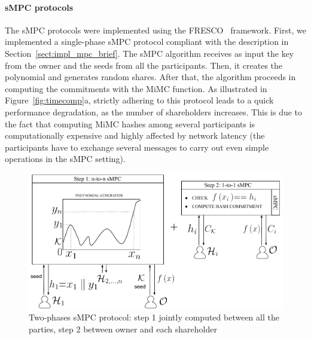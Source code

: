 \medskip

\paragraph*{sMPC protocols}

The sMPC protocols were implemented using the FRESCO~\cite{FRESCO-git,damgaard2016mpc} framework.
First, we implemented a single-phase sMPC protocol compliant with the description in Section~\ref{sect:impl_mpc_brief}.
The sMPC algorithm receives as input the key \key from the owner \owner and the seeds from all the participants. Then, it creates the polynomial and generates random shares. After that, the algorithm proceeds in computing the commitments with the MiMC function.
As illustrated in Figure~\ref{fig:timecomp}a, strictly adhering to this protocol leads to a quick performance degradation, as the number of shareholders increases. This is due to the fact that computing MiMC hashes among several participants is computationally expensive and highly affected by network latency (the participants have to exchange several messages to carry out even simple operations in the sMPC setting).

\begin{figure}[t]
	\centering
	\includegraphics[width=0.9\columnwidth]{fig/mpc_rev_2}
	
	\caption{Two-phases sMPC protocol: step 1 jointly computed between all the parties, step 2 between owner and each shareholder}\vspace*{-2pt}
	\label{fig:mpc2}%
\end{figure}

